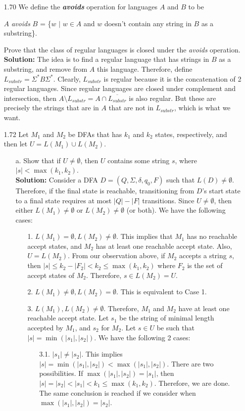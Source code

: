 \begin{enumerate}
\item[1.70]We define the \textbf{\emph{avoids}} operation for languages $A$ and $B$ to be
\begin{center}
$A$ \emph{avoids} $B$ = \{$w$ $|$ $w \in A$ and $w$ doesn't contain any string in $B$ as a substring\}.
\end{center}
Prove that the class of regular languages is closed under the \emph{avoids} operation.
\\
\textbf{Solution:} The idea is to find a regular language that has strings in $B$ as a substring, and remove from $A$ this language. Therefore, define $L_{substr} = \Sigma^*B\Sigma^*$. Clearly, $L_{substr}$ is regular because it is the concatenation of 2 regular languages. Since regular languages are closed under complement and intersection, then $A \setminus L_{substr} = A \cap \overline{L_{substr}}$ is also regular. But these are precisely the strings that are in $A$ that are not in $L_{substr}$, which is what we want.

\item[1.72]Let $M_1$ and $M_2$ be DFAs that has $k_1$ and $k_2$ states, respectively, and then let $U = L(M_1) \cup L(M_2)$. 
\begin{enumerate}
\item[a.]Show that if $U \ne \emptyset$, then $U$ contains some string $s$, where $|s| < \max(k_1, k_2)$.
\\
\textbf{Solution:} Consider a DFA $D = (Q, \Sigma, \delta, q_0, F)$ such that $L(D) \ne \emptyset$. Therefore, if the final state is reachable, transitioning from $D$'s start state to a final state requires at most $|Q| - |F|$ transitions. Since $U \ne \emptyset$, then either $L(M_1) \ne \emptyset$ or $L(M_2) \ne \emptyset$ (or both). We have the following cases:
\begin{enumerate}
\item[1.] $L(M_1) = \emptyset, L(M_2) \ne \emptyset$. This implies that $M_1$ has no reachable accept states, and $M_2$ has at least one reachable accept state. Also, $U = L(M_2)$. From our observation above, if $M_2$ accepts a string $s$, then $|s| \le k_2 - |F_2| < k_2 \le \max(k_1, k_2)$ where $F_2$ is the set of accept states of $M_2$. Therefore, $s \in L(M_2) = U$.

\item[2.] $L(M_1) \ne \emptyset, L(M_2) = \emptyset$. This is equivalent to Case 1.

\item[3.] $L(M_1), L(M_2) \ne \emptyset$. Therefore, $M_1$ and $M_2$ have at least one reachable accept state. Let $s_1$ be the string of minimal length accepted by $M_1$, and $s_2$ for $M_2$. Let $s \in U$ be such that $|s| = \min(|s_1|, |s_2|)$. We have the following 2 cases:
\begin{enumerate}
\item[3.1.] $|s_1| \ne |s_2|$. This implies $|s| = \min(|s_1|, |s_2|) < \max(|s_1|, |s_2|)$. There are two possibilities. If $\max(|s_1|, |s_2|) = |s_1|$, then $|s| = |s_2| < |s_1| < k_1 \le \max(k_1, k_2)$. Therefore, we are done. The same conclusion is reached if we consider when $\max(|s_1|, |s_2|) = |s_2|$. 


\end{enumerate}
\end{enumerate}
\end{enumerate}
\end{enumerate}

